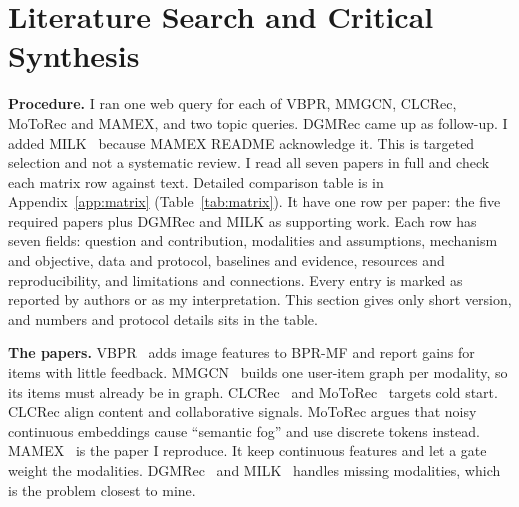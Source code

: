 \documentclass[conference]{IEEEtran}
\begin{document}
\section{Literature Search and Critical Synthesis}
\label{sec:lit}

\textbf{Procedure.} I ran one web query for each of VBPR, MMGCN, CLCRec, MoToRec and MAMEX, and two topic queries. DGMRec came up as follow-up. I added MILK~\cite{bai2024milk} because MAMEX README acknowledge it. This is targeted selection and not a systematic review. I read all seven papers in full and check each matrix row against text. Detailed comparison table is in Appendix~\ref{app:matrix} (Table~\ref{tab:matrix}). It have one row per paper: the five required papers plus DGMRec and MILK as supporting work. Each row has seven fields: question and contribution, modalities and assumptions, mechanism and objective, data and protocol, baselines and evidence, resources and reproducibility, and limitations and connections. Every entry is marked as reported by authors or as my interpretation. This section gives only short version, and numbers and protocol details sits in the table.

\textbf{The papers.} VBPR~\cite{he2016vbpr} adds image features to BPR-MF and report gains for items with little feedback. MMGCN~\cite{wei2019mmgcn} builds one user-item graph per modality, so its items must already be in graph. CLCRec~\cite{wei2021clcrec} and MoToRec~\cite{liu2026motorec} targets cold start. CLCRec align content and collaborative signals. MoToRec argues that noisy continuous embeddings cause ``semantic fog'' and use discrete tokens instead. MAMEX~\cite{nguyen2025mamex} is the paper I reproduce. It keep continuous features and let a gate weight the modalities. DGMRec~\cite{kim2025dgmrec} and MILK~\cite{bai2024milk} handles missing modalities, which is the problem closest to mine.
\end{document}
